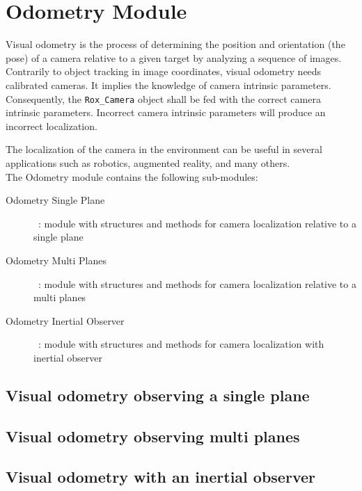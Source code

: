 \chapter{Odometry Module}
\label{cha:vodom}
Visual odometry is the process of determining the position and
orientation (the pose) of a camera relative to a given target by
analyzing a sequence of images. Contrarily to object tracking in
image coordinates, visual odometry needs calibrated cameras. It 
implies the knowledge of camera intrinsic parameters. Consequently, 
the \lstinline$Rox_Camera$ object shall be fed with the correct 
camera  intrinsic parameters. Incorrect camera intrinsic parameters
will produce an incorrect localization.

The localization of the camera in the environment can be useful in several applications such as robotics, augmented reality, and many others.\\

The Odometry module contains the following sub-modules:

\begin{description}
  \item[Odometry Single Plane]~: module with structures and methods for camera localization relative to a single plane
  \item[Odometry Multi Planes]~: module with structures and methods for camera localization relative to a multi planes
  \item[Odometry Inertial Observer]~: module with structures and methods for camera localization with inertial observer
\end{description}

\section{Visual odometry observing a single plane}
\label{sec:vodm_single_plane}





\section{Visual odometry observing multi planes}
\label{sec:vodm_multi_plane}

%



\section{Visual odometry with an inertial observer}


